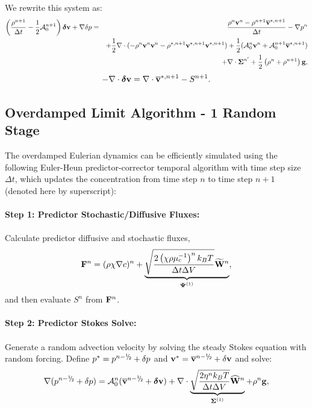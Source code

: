 \documentclass[final]{siamltex}
\newcommand{\sfrac}[2]{\mathchoice
  {\kern0em\raise.5ex\hbox{\the\scriptfont0 #1}\kern-.15em/
   \kern-.15em\lower.25ex\hbox{\the\scriptfont0 #2}}
  {\kern0em\raise.5ex\hbox{\the\scriptfont0 #1}\kern-.15em/
   \kern-.15em\lower.25ex\hbox{\the\scriptfont0 #2}}
  {\kern0em\raise.5ex\hbox{\the\scriptscriptfont0 #1}\kern-.2em/
   \kern-.15em\lower.25ex\hbox{\the\scriptscriptfont0 #2}}
  {#1\!/#2}}
\def\Fb {{\bf F}}
\def\gb {{\bf g}}
\def\vb {{\bf v}}
\def\Wb {{\bf W}}
\def\deltab {\boldsymbol{\delta}}
\def\Psib   {\boldsymbol{\Psi}}
\def\Sigmab {\boldsymbol{\Sigma}}
\def\half   {\frac{1}{2}}
\def\myhalf {\sfrac{1}{2}}
\begin{document}
We rewrite this system as:
\begin{eqnarray}
\left(\frac{\rho^{n+1}}{\Delta t} - \half\mathcal{A}_0^{n+1}\right)\deltab\vb + \nabla\delta p &=& \frac{\rho^n\vb^n-\rho^{n+1}\overline\vb^{*,n+1}}{\Delta t} -\nabla p^n\nonumber\\
&&+ \half\nabla\cdot(-\rho^n\vb^n\vb^n - \rho^{*,n+1}\vb^{*,n+1}\vb^{*,n+1}) + \half(\mathcal{A}_0^n\vb^n + \mathcal{A}_0^{n+1}\overline\vb^{*,n+1} )\nonumber\\
&&+ \nabla\cdot\Sigmab^{n'} + \half\left(\rho^n+\rho^{n+1}\right)\gb,
\end{eqnarray}
\begin{equation}
-\nabla\cdot\deltab\vb = \nabla\cdot\overline\vb^{*,n+1} - S^{n+1}.
\end{equation}

\subsection{Overdamped Limit Algorithm - 1 Random Stage}
The overdamped Eulerian dynamics can be efficiently simulated using the following Euler-Heun 
predictor-corrector temporal algorithm with time step size $\Delta t$, which updates the 
concentration from time step $n$ to time step $n+1$ (denoted here by superscript):\\ \\
{\bf Step 1: Predictor Stochastic/Diffusive Fluxes:}\\ \\
Calculate predictor diffusive and stochastic fluxes,
\begin{equation}
\Fb^n = (\rho\chi\nabla c)^n + \underbrace{\sqrt{\frac{2\left(\chi\rho\mu_c^{-1}\right)^n k_B T}{\Delta t\Delta V}}\widetilde\Wb^n}_{\Psib^{(1)}},
\end{equation}
and then evaluate $S^n$ from $\Fb^n$.\\ \\
{\bf Step 2: Predictor Stokes Solve:}\\ \\
Generate a random advection velocity by solving the steady Stokes equation with random forcing.
Define $p^* = p^{n-\myhalf} + \delta p$ and $\vb^* = \overline\vb^{n-\myhalf} + \delta\vb$ and solve:
\begin{equation}
\nabla(p^{n-\myhalf} + \delta p) = \mathcal A_0^n(\overline\vb^{n-\myhalf} + \deltab\vb) + \nabla\cdot\underbrace{\sqrt{\frac{2\eta^n k_B T}{\Delta t\Delta V}}\widehat\Wb^n}_{\Sigmab^{(1)}} + \rho^n\gb,
\end{equation}
\end{document}
